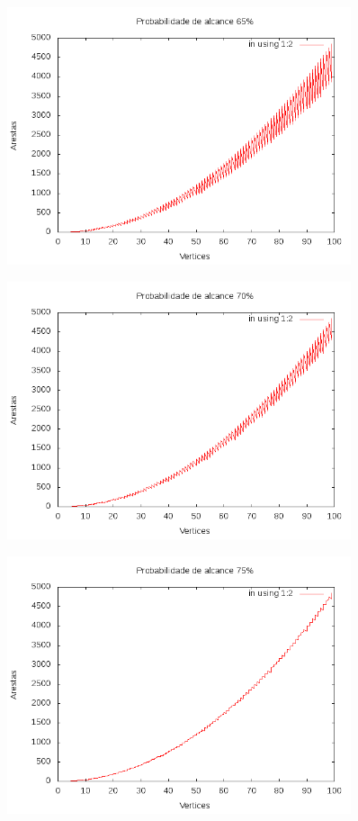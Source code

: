 \documentclass{article}
\begin{document}
\begin{figure}[h]
	\includegraphics[width=0.9\textwidth]{65.png}
\end{figure}
\begin{figure}[h]
	\includegraphics[width=0.9\textwidth]{70.png}
\end{figure}
\begin{figure}[h]
	\includegraphics[width=0.9\textwidth]{75.png}
\end{figure}
\end{document}
